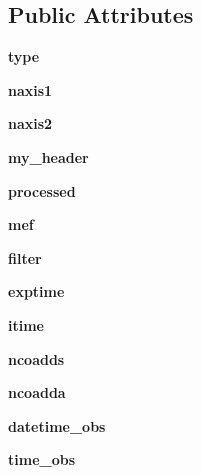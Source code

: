 \subsection*{Public Attributes}
\begin{CompactItemize}
\item 
\textbf{type}\label{classdatahandler_1_1dataclassifier_1_1ClFits_47af6a04eaba64e0b0f5ee986c364787}

\item 
\textbf{naxis1}\label{classdatahandler_1_1dataclassifier_1_1ClFits_1dd73cbd0bca4dfe253741ab82f0b962}

\item 
\textbf{naxis2}\label{classdatahandler_1_1dataclassifier_1_1ClFits_28a6a86f547537766a114b6f2bd0d517}

\item 
\textbf{my\_\-header}\label{classdatahandler_1_1dataclassifier_1_1ClFits_a3a3d7af5c8c8152c9bb76bc73d4f433}

\item 
\textbf{processed}\label{classdatahandler_1_1dataclassifier_1_1ClFits_244b4153c61befaf7a4b2e6a34fbade3}

\item 
\textbf{mef}\label{classdatahandler_1_1dataclassifier_1_1ClFits_6b0cbd8514acf3b2b57aef635f3d690c}

\item 
\textbf{filter}\label{classdatahandler_1_1dataclassifier_1_1ClFits_651e8d449b66f437e890326da8d0b1ec}

\item 
\textbf{exptime}\label{classdatahandler_1_1dataclassifier_1_1ClFits_a50cb1197f551de8fa8422397a2d9eb2}

\item 
\textbf{itime}\label{classdatahandler_1_1dataclassifier_1_1ClFits_37052d32d3605df58627249fde06be59}

\item 
\textbf{ncoadds}\label{classdatahandler_1_1dataclassifier_1_1ClFits_914e27069db04e466f3b9c3396ce132b}

\item 
\textbf{ncoadda}\label{classdatahandler_1_1dataclassifier_1_1ClFits_3cd51e3fac9a8c66b62f8c4fe1df43c7}

\item 
\textbf{datetime\_\-obs}\label{classdatahandler_1_1dataclassifier_1_1ClFits_141e31b0e7786d2b98f6c276c8a401f1}

\item 
\textbf{time\_\-obs}\label{classdatahandler_1_1dataclassifier_1_1ClFits_d09e84d9e2187a9daf6a705e0b4571f6}


\end{CompactItemize}
